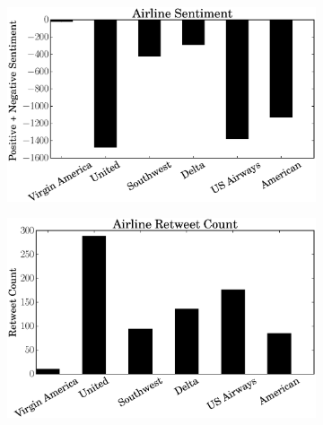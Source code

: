 \documentclass[a4paper, 12pt]{article}
\begin{document}
\begin{figure}[htpb]
    \centering
    \begin{subfigure}[htpb]{0.45\textwidth}
        \includegraphics[width=\textwidth]{airline_sentiment}
        \caption{}
        \label{fig:snt}
    \end{subfigure}
    \begin{subfigure}[htpb]{0.45\textwidth}
        \includegraphics[width=\textwidth]{airline_retweet}
        \caption{}
        \label{fig:ret}
    \end{subfigure}
    \hfill %
    \begin{subfigure}[htpb]{0.45\textwidth}

\end{subfigure}
\end{figure}
\end{document}
